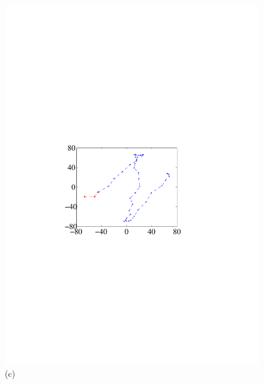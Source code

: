 \begin{figure}[!ht]
{\begin{minipage}[b]{0.23\textwidth}
                \includegraphics[width=\textwidth]{fig/distance-3-5m.pdf}\\
                \centering  (c)
                \end{minipage}
            }
            \hfill
\end{figure}
